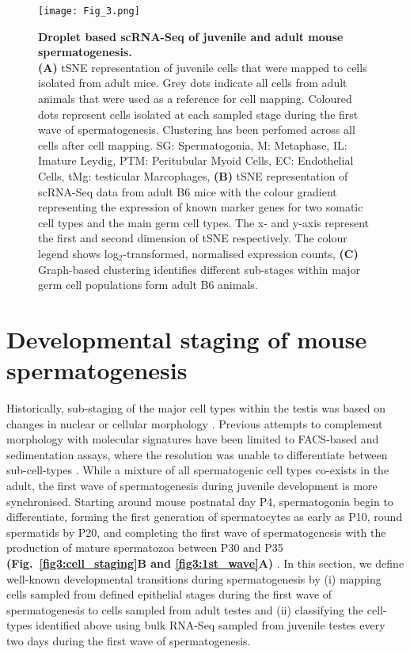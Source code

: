 \begin{figure}[!h]
\centering
\texttt{[image: Fig\_3.png]}
\caption[Droplet based scRNA-Seq of juvenile and adult mouse spermatogenesis]{\textbf{Droplet based scRNA-Seq of juvenile and adult mouse spermatogenesis.}\\
\textbf{(A)} tSNE representation of juvenile cells that were mapped to cells isolated from adult mice. Grey dots indicate all cells from adult animals that were used as a reference for cell mapping. Coloured dots represent cells isolated at each sampled stage during the first wave of spermatogenesis. Clustering has been perfomed across all cells after cell mapping. SG: Spermatogonia, M: Metaphase, IL: Imature Leydig, PTM: Peritubular Myoid Cells, EC: Endothelial Cells, tMg: testicular Marcophages, \textbf{(B)} tSNE representation of scRNA-Seq data from adult B6 mice with the colour gradient representing the expression of known marker genes for two somatic cell types and the main germ cell types. The x- and y-axis represent the first and second dimension of tSNE respectively. The colour legend shows log$_2$-transformed, normalised expression counts, \textbf{(C)} Graph-based clustering identifies different sub-stages within major germ cell populations form adult B6 animals. 
}
\label{fig3:cell_types}
\end{figure}

\newpage

\section{Developmental staging of mouse spermatogenesis}

Historically, sub-staging of the major cell types within the testis was based on changes in nuclear or cellular morphology \citep{Oakberg1956,  Oakberg1956a}. Previous attempts to complement morphology with molecular signatures have been limited to FACS-based and sedimentation assays, where the resolution was unable to differentiate between sub-cell-types \citep{Bastos2005, Gaysinskaya2014, Lam1970, Meistrich1977, Romrell1976, Soumillon2013}. While a mixture of all spermatogenic cell types co-exists in the adult, the first wave of spermatogenesis during juvenile development is more synchronised. Starting around mouse postnatal day P4, spermatogonia begin to differentiate, forming the first generation of spermatocytes as early as P10, round spermatids by P20, and completing the first wave of spermatogenesis with the production of mature spermatozoa between P30 and P35 \textbf{(Fig.~\ref{fig3:cell_staging}B and \ref{fig3:1st_wave}A)} \citep{Bellve1977, Janca1986, Nebel1961}. In this section, we define well-known developmental transitions during spermatogenesis by (i) mapping cells sampled from defined epithelial stages during the first wave of spermatogenesis to cells sampled from adult testes and (ii) classifying the cell-types identified above using bulk RNA-Seq sampled from juvenile testes every two days during the first wave of spermatogenesis. 

